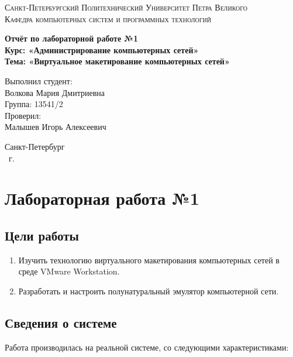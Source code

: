 \documentclass[14pt,a4paper,report]{report}
\begin{document}
\def\contentsname{Содержание}

\begin{titlepage}
	\begin{center}
		\textsc{Санкт-Петербургский Политехнический 
			Университет Петра Великого\\[5mm]
			Кафедра компьютерных систем и программных технологий}
		
		\vfill
		
		\textbf{Отчёт по лабораторной работе №1\\[3mm]
			Курс: «Администрирование компьютерных сетей»\\[3mm]
			Тема: «Виртуальное макетирование компьютерных сетей»\\[35mm]
			}
	\end{center}
	
	\hfill
	\begin{minipage}{.5\textwidth}
		Выполнил студент:\\[2mm] 
		Волкова Мария Дмитриевна\\
		Группа: 13541/2\\[5mm]
		
		Проверил:\\[2mm] 
		Малышев Игорь Алексеевич
	\end{minipage}
	\vfill
	\begin{center}
		Санкт-Петербург\\ \the\year\ г.
	\end{center}
\end{titlepage}

\tableofcontents
\clearpage
\chapter{Лабораторная работа №1}
\section{Цели работы}
\begin{enumerate}
\item Изучить технологию виртуального макетирования компьютерных сетей в среде VMware Workstation.
\item Разработать и настроить полунатуральный эмулятор компьютерной сети.
\end{enumerate}

\section{Сведения о системе}
Работа производилась на реальной системе, со следующими характеристиками:
\end{document}
